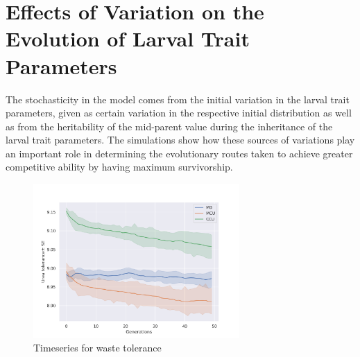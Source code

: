 \section{Effects of Variation on the Evolution of Larval Trait Parameters}
The stochasticity in the model comes from the initial variation in the larval trait parameters, given as certain variation in the respective initial distribution as well as from the heritability of the mid-parent value during the inheritance of the larval trait parameters. The simulations show how these sources of variations play an important role in determining the evolutionary routes taken to achieve greater competitive ability by having maximum survivorship.
\begin{figure}[t]
  \centering
  \includegraphics[trim = 0 0 50 50, clip, width=0.7\textwidth]{C4/Figs/wtol}
  \caption{Timeseries for waste tolerance}
  \label{wtol}
\end{figure}
